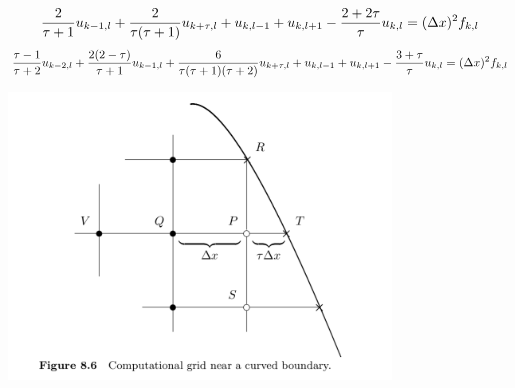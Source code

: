 \documentclass[11pt]{article}
\begin{document}
\begin{enumerate}
    \[
        \frac{2}{\tau+1} u_{k-1,l} + \frac{2}{\tau(\tau+1)} u_{k+\tau,l} + u_{k,l-1} + u_{k, l+1} - \frac{2+2\tau}{\tau} u_{k,l} = (\Delta x)^2 f_{k,l}
    \]
    \[
        \frac{\tau-1}{\tau+2} u_{k-2,l} + \frac{2(2-\tau)}{\tau+1} u_{k-1,l} + \frac{6}{\tau(\tau+1)(\tau+2)} u_{k+\tau, l} + u_{k,l-1} + u_{k,l+1} - \frac{3+\tau}{\tau} u_{k,l}
        = (\Delta x)^2 f_{k,l}
    \]
    \begin{center}
        \includegraphics[width=4in]{near_boundary_stencil}
    \end{center}
\end{enumerate}
\end{document}
